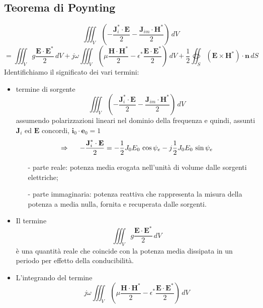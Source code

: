 \documentclass[a4paper]{article}
\begin{document}
\subsection*{Teorema di Poynting}
\begin{equation*}
\iiint_V(-\frac{\textbf{J}_i^*\cdot\textbf{E}}{2}-\frac{\textbf{J}_{im}\cdot\textbf{H}^*}{2})\,dV
\end{equation*}
\begin{equation*}
=\iiint_Vg\frac{\textbf{E}\cdot\textbf{E}^*}{2}\,dV+j\omega\iiint_V(\mu\frac{\textbf{H}\cdot\textbf{H}^*}{2}-\epsilon^*\frac{\textbf{E}\cdot\textbf{E}^*}{2})\,dV+\frac{1}{2}\oiint_S(\textbf{E}\times\textbf{H}^*)\cdot\textbf{n}\,dS
\end{equation*}
Identifichiamo il significato dei vari termini:
\begin{itemize}
\item termine di sorgente
\begin{equation*}
\iiint_V(-\frac{\textbf{J}_i^*\cdot\textbf{E}}{2}-\frac{\textbf{J}_{im}\cdot\textbf{H}^*}{2})\,dV
\end{equation*}
assumendo polarizzazioni lineari nel dominio della frequenza e quindi, assunti $\textbf{J}_i$ ed $\textbf{E}$ concordi, $\textbf{i}_0\cdot\textbf{e}_0=1$
\begin{equation*}
\Rightarrow\hspace{5mm}-\frac{\textbf{J}_i^*\cdot\textbf{E}}{2}=-\frac{1}{2}J_0E_0\,\cos\psi_e-j\frac{1}{2}J_0E_0\,\sin\psi_e
\end{equation*}
\begin{itemize}
\item[-] parte reale: potenza media erogata nell'unità di volume dalle sorgenti elettriche;
\item[-] parte immaginaria: potenza reattiva che rappresenta la misura della potenza a media nulla, fornita e recuperata dalle sorgenti.
\end{itemize}
\item Il termine
\begin{equation*}
\iiint_Vg\frac{\textbf{E}\cdot\textbf{E}^*}{2}\,dV
\end{equation*}
è una quantità reale che coincide con la potenza media dissipata in un periodo per effetto della conducibilità.
\item L'integrando del termine
\begin{equation*}
j\omega\iiint_V(\mu\frac{\textbf{H}\cdot\textbf{H}^*}{2}-\epsilon^*\frac{\textbf{E}\cdot\textbf{E}^*}{2})\,dV
\end{equation*}

\end{itemize}
\end{document}
